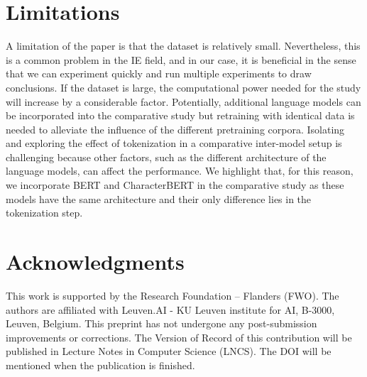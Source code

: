 \documentclass[runningheads]{llncs}
\begin{document}
\section*{Limitations}
\vspace{-2.5mm}
A limitation of the paper is that the dataset is relatively small. Nevertheless, this is a common problem in the IE field, and in our case, it is beneficial in the sense that we can experiment quickly and run multiple experiments to draw conclusions. If the dataset is large, the computational power needed for the study will increase by a considerable factor. Potentially, additional language models can be incorporated into the comparative study \cite{clark-etal-2022-canine,xue-etal-2022-byt5} but retraining with identical data is needed to alleviate the influence of the different pretraining corpora. Isolating and exploring the effect of tokenization in a comparative inter-model setup is challenging because other factors, such as the different architecture of the language models, can affect the performance. We highlight that, for this reason, we incorporate BERT and CharacterBERT in the comparative study as these models have the same architecture and their only difference lies in the tokenization step. 
\vspace{-8mm}

\section*{Acknowledgments}
This work is supported by the Research Foundation – Flanders (FWO). The authors are affiliated with Leuven.AI - KU Leuven institute for AI, B-3000, Leuven, Belgium. This preprint has not undergone any post-submission improvements or corrections. The Version of Record of this contribution will be published in Lecture Notes in Computer Science (LNCS). The DOI will be mentioned when the publication is finished. 


















\end{document}
